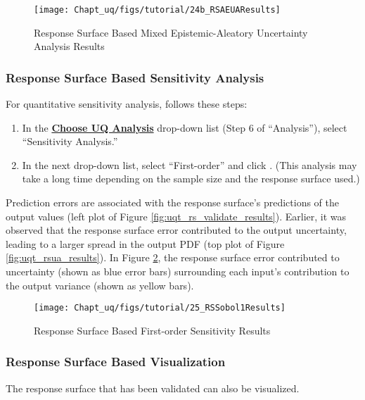 \begin{figure}[H]
\centering \texttt{[image: Chapt\_uq/figs/tutorial/24b\_RSAEUAResults]}
\caption{Response Surface Based Mixed Epistemic-Aleatory Uncertainty Analysis Results}
\label{fig:uqt_rsaeua_results}
\end{figure}

\subsubsection{Response Surface Based Sensitivity Analysis}

For quantitative sensitivity analysis, follows these steps:
\begin{enumerate}
\item{In the \textbf{\underline{Choose UQ Analysis}} drop-down list (Step 6 of ``Analysis''), select ``Sensitivity Analysis.''}
\item{In the next drop-down list, select ``First-order'' and click . (This analysis may
take a long time depending on the sample size and the response surface used.)}
\end{enumerate}
Prediction errors are associated with the response surface's predictions of the output values (left plot of Figure \ref{fig:uqt_rs_validate_results}). Earlier, it was observed that the response surface error contributed to the output uncertainty, leading to a larger spread in the output PDF (top plot of Figure \ref{fig:uqt_rsua_results}). In Figure \ref{fig:uqt_rssa_results}, the response surface error contributed to uncertainty (shown as blue error bars) surrounding each input's contribution to the output variance (shown as yellow bars).

\begin{figure}[H]
	\centering \texttt{[image: Chapt\_uq/figs/tutorial/25\_RSSobol1Results]}
	\caption{Response Surface Based First-order Sensitivity Results}
	\label{fig:uqt_rssa_results}
\end{figure}

\subsubsection{Response Surface Based Visualization}

The response surface that has been validated can also be visualized.

